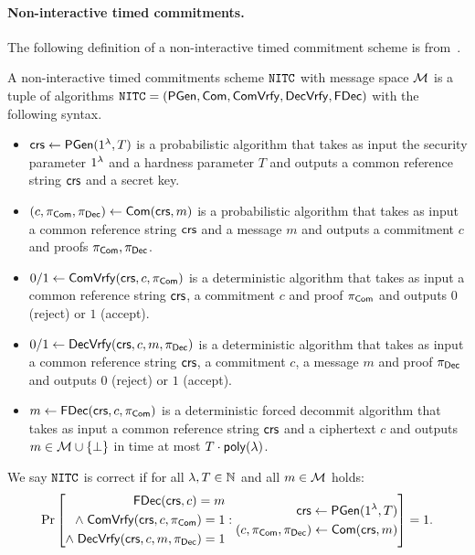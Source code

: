 \paragraph{Non-interactive timed commitments.}
The following definition of a non-interactive timed commitment scheme is from~\cite{TCC:KatLosXu20}.
\begin{definition}
\label{def:nitc_syntax}
A non-interactive timed commitments scheme $\mathtt{NITC}$ with message space $\mathcal{M}$ is a tuple of algorithms $\mathtt{NITC} = (\mathsf{PGen}, \mathsf{Com}, \mathsf{ComVrfy}, \mathsf{DecVrfy}, \allowbreak \mathsf{FDec})$ with the following syntax.
\begin{itemize}
\item $\mathsf{crs} \leftarrow \mathsf{PGen}(1{^{\lambda}}, T)$ is a probabilistic algorithm that takes as input the security parameter $1{^{\lambda}}$ and a hardness parameter $T$ and outputs a common reference string $\mathsf{crs}$ and a secret key.
\item $(c, \pi_{\mathsf{Com}}, \pi_{\mathsf{Dec}}) \leftarrow \mathsf{Com}(\mathsf{crs}, m)$ is a probabilistic algorithm that takes as input a common reference string $\mathsf{crs}$ and a message $m$ and outputs a commitment $c$ and proofs $\pi_{\mathsf{Com}}, \pi_{\mathsf{Dec}}$.
\item $0/1 \leftarrow \mathsf{ComVrfy}(\mathsf{crs}, c, \pi_{\mathsf{Com}})$ is a deterministic algorithm that takes as input a common reference string $\mathsf{crs}$, a commitment $c$ and proof $\pi_{\mathsf{Com}}$ and outputs $0$ (reject) or $1$ (accept).
\item $0/1 \leftarrow \mathsf{DecVrfy}(\mathsf{crs}, c, m, \pi_{\mathsf{Dec}})$ is a deterministic algorithm that takes as input a common reference string $\mathsf{crs}$, a commitment $c$, a message $m$ and proof $\pi_{\mathsf{Dec}}$ and outputs $0$ (reject) or $1$ (accept).
\item $m \leftarrow \mathsf{FDec}(\mathsf{crs}, c, \pi_{\mathsf{Com}})$ is a deterministic forced decommit algorithm that takes as input a common reference string $\mathsf{crs}$ and a ciphertext $c$ and outputs $m \in \mathcal{M} \cup \{\bot\}$ in time at most $T \cdot \mathsf{poly}(\lambda)$.
\end{itemize}
We say $\mathtt{NITC}$ is correct if for all $\lambda, T \in \mathbb{N}$ and all $m \in \mathcal{M}$ holds:
\[\Pr\left[
\begin{aligned}
\mathsf{FDec}(\mathsf{crs}, c) = m \\
\land \; \mathsf{ComVrfy}(\mathsf{crs}, c, \pi_{\mathsf{Com}}) = 1 \\
\land \; \mathsf{DecVrfy}(\mathsf{crs}, c, m, \pi_{\mathsf{Dec}})=1
\end{aligned}
: 
\begin{aligned}
      \mathsf{crs} \leftarrow \mathsf{PGen}(1{^{\lambda}}, T) \\
      (c, \pi_{\mathsf{Com}}, \pi_{\mathsf{Dec}}) \leftarrow \mathsf{Com}(\mathsf{crs}, m) \\
    \end{aligned}
\right] = 1.
\]
\end{definition}

